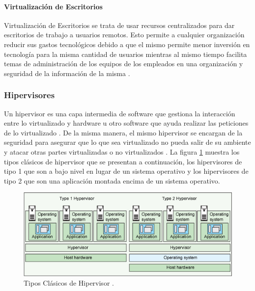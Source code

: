 \paragraph{Virtualización de Escritorios}
Virtualización de Escritorios se trata de usar recursos centralizados para dar escritorios de trabajo a usuarios remotos. Esto permite a cualquier organización reducir sus gastos tecnológicos debido a que el mismo permite menor inversión en tecnología para la misma cantidad de usuarios mientras al mismo tiempo facilita temas de administración de los equipos de los empleados en una organización y seguridad de la información de la misma \citep{VMWare-Virtualization}.

\subsubsection{Hipervisores}
Un hipervisor es una capa intermedia de software que gestiona la interacción entre lo virtualizado y hardware u otro software que ayuda realizar las peticiones de lo virtualizado \citep{VMWare-Virtualization}. De la misma manera, el mismo hipervisor se encargan de la seguridad para asegurar que lo que sea virtualizado no pueda salir de su ambiente y atacar otras partes virtualizadas o no virtualizados \citep{VMWare-HypervisorSecurity} \citep{IBM-KVM-Security}. La figura \ref{IBM-HypervisorTypes} muestra los tipos clásicos de hipervisor que se presentan a continuación, los hipervisores de tipo 1 que son a bajo nivel en lugar de un sistema operativo y los hipervisores de tipo 2 que son una aplicación montada encima de un sistema operativo.

\begin{figure}
  \begin{center}
      \includegraphics[width=\textwidth]{Figures/ibm-hypervisortypes.png}
  \end{center}
  \caption{Tipos Clásicos de Hipervisor \citep{IBM-Hypervisors}.}
  \label{IBM-HypervisorTypes}
\end{figure}

